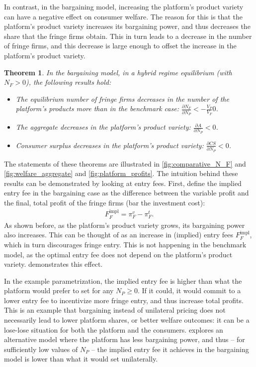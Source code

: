 \documentclass[a4paper]{article}
\newtheorem{theorem}{Theorem}
\begin{document}
In contrast, in the bargaining model, increasing the platform's product variety can have a negative effect on consumer welfare.
The reason for this is that the platform's product variety increases its bargaining power, and thus decreases the share that the fringe firms obtain.
This in turn leads to a decrease in the number of fringe firms, and this decrease is large enough to offset the increase in the platform's product variety.
\begin{theorem}
    \label{prop:bargaining_results}
    In the bargaining model, in a hybrid regime equilibrium (with $N_F > 0$), the following results hold:
    \begin{itemize}
        \item The equilibrium number of fringe firms decreases in the number of the platform's products more than in the benchmark case: $\frac{\partial N_F}{\partial N_P} < -\frac{V_P}{V_F} 0$.
        \item The aggregate decreases in the platform's product variety: $\frac{\partial A}{\partial N_P} < 0$.
        \item Consumer surplus decreases in the platform's product variety: $\frac{\partial CS}{\partial N_P} < 0$.
    \end{itemize}
\end{theorem}

The statements of these theorems are illustrated in \cref{fig:comparative_N_F} and \cref{fig:welfare_aggregate} and \cref{fig:platform_profits}.
The intuition behind these results can be demonstrated by looking at entry fees.
First, define the implied entry fee in the bargaining case as the difference between the variable profit and the final, total profit of the fringe firms (bar the investment cost):
\begin{align*}
    F_F^{\text{impl}} = \pi_F^v - \pi_F^t.
\end{align*}
As shown before, as the platform's product variety grows, its bargaining power also increases.
This can be thought of as an increase in (implied) entry fees $F_F^{\text{impl}}$, which in turn discourages fringe entry.
This is not happening in the benchmark model, as the optimal entry fee does not depend on the platform's product variety.
 demonstrates this effect.

In the example parametrization, the implied entry fee is higher than what the platform would prefer to set for any $N_P \geq 0$.
If it could, it would commit to a lower entry fee to incentivize more fringe entry, and thus increase total profits.
This is an example that bargaining instead of unilateral pricing does not necessarily lead to lower platform shares, or better welfare outcomes: it can be a lose-lose situation for both the platform and the consumers.
 explores an alternative model where the platform has less bargaining power, and thus -- for sufficiently low values of $N_P$ -- the implied entry fee it achieves in the bargaining model is lower than what it would set unilaterally.
\end{document}
